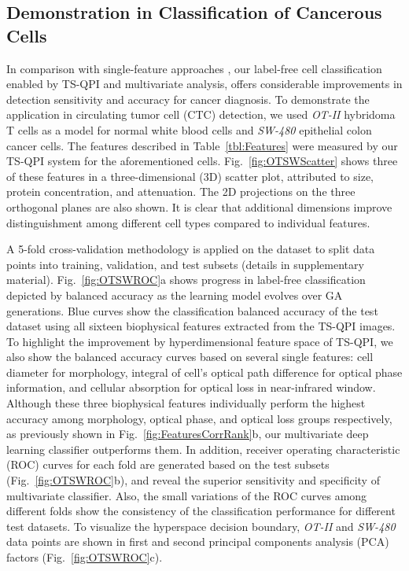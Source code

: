 \documentclass[aps,pra,reprint,superscriptaddress]{revtex4-1}
\begin{document}
\subsection*{Demonstration in Classification of Cancerous Cells}

In comparison with single-feature approaches \cite{nagrath2007isolation, vona2000isolation, kling2012beyond}, our label-free cell classification enabled by TS-QPI and multivariate analysis, offers considerable improvements in detection sensitivity and accuracy for cancer diagnosis. To demonstrate the application in circulating tumor cell (CTC) detection, we used \textit{OT-II} hybridoma T cells as a model for normal white blood cells and \textit{SW-480} epithelial colon cancer cells. The features described in Table~\ref{tbl:Features} were measured by our TS-QPI system for the aforementioned cells. Fig.~\ref{fig:OTSWScatter} shows three of these features in a three-dimensional (3D) scatter plot, attributed to size, protein concentration, and attenuation. The 2D projections on the three orthogonal planes are also shown. It is clear that additional dimensions improve distinguishment among different cell types compared to individual features.

A 5-fold cross-validation methodology is applied on the dataset to split data points into training, validation, and test subsets (details in supplementary material). Fig.~\ref{fig:OTSWROC}a shows progress in label-free classification depicted by balanced accuracy as the learning model evolves over GA generations. Blue curves show the classification balanced accuracy of the test dataset using all sixteen biophysical features extracted from the TS-QPI images. To highlight the improvement by hyperdimensional feature space of TS-QPI, we also show the balanced accuracy curves based on several single features: cell diameter for morphology, integral of cell's optical path difference for optical phase information, and cellular absorption for optical loss in near-infrared window. Although these three biophysical features individually perform the highest accuracy among morphology, optical phase, and optical loss groups respectively, as previously shown in Fig.~\ref{fig:FeaturesCorrRank}b, our multivariate deep learning classifier outperforms them. In addition, receiver operating characteristic (ROC) curves for each fold are generated based on the test subsets (Fig.~\ref{fig:OTSWROC}b), and reveal the superior sensitivity and specificity of multivariate classifier. Also, the small variations of the ROC curves among different folds show the consistency of the classification performance for different test datasets. To visualize the hyperspace decision boundary, \textit{OT-II} and \textit{SW-480} data points are shown in first and second principal components analysis (PCA) factors (Fig.~\ref{fig:OTSWROC}c).
\end{document}
